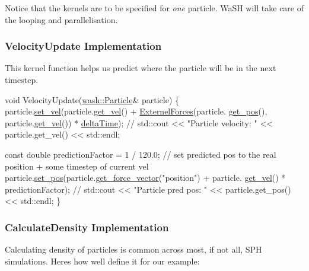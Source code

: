 Notice that the kernels are to be specified for {\itshape one} particle. Wa\+SH will take care of the looping and parallelisation.

\subsubsection*{Velocity\+Update Implementation}

This kernel function helps us predict where the particle will be in the next timestep. 
\begin{DoxyCode}
\textcolor{keywordtype}{void} VelocityUpdate(\mbox{\hyperlink{classwash_1_1Particle}{wash::Particle}}& particle) \{
    particle.\mbox{\hyperlink{classwash_1_1Particle_a4755365883cfd62117ebe74fe44d35e0}{set\_vel}}(particle.\mbox{\hyperlink{classwash_1_1Particle_a890d0f1467225393e385872b0c98b974}{get\_vel}}() + \mbox{\hyperlink{ca__fluid__sim_2fluid__sim_8cpp_a96532193226b3cbb236e6465defeb469}{ExternelForces}}(particle.
      \mbox{\hyperlink{classwash_1_1Particle_a9d222d453d640cf629ee8dfbee6b43c2}{get\_pos}}(), particle.\mbox{\hyperlink{classwash_1_1Particle_a890d0f1467225393e385872b0c98b974}{get\_vel}}()) * \mbox{\hyperlink{3d__fluid__sim_2fluid__sim_8cpp_a78e0adba8d27825f587ec87ed578015f}{deltaTime}});
    \textcolor{comment}{// std::cout << "Particle velocity: " << particle.get\_vel() << std::endl;}

    \textcolor{keyword}{const} \textcolor{keywordtype}{double} predictionFactor = 1 / 120.0;
    \textcolor{comment}{// set predicted pos to the real position + some timestep of current vel}
    particle.\mbox{\hyperlink{classwash_1_1Particle_af06835533935c04e594c258a7dcdd1ef}{set\_pos}}(particle.\mbox{\hyperlink{classwash_1_1Particle_a9c6ec5d5a7407897ecca00549bd05c01}{get\_force\_vector}}(\textcolor{stringliteral}{"position"}) + particle.
      \mbox{\hyperlink{classwash_1_1Particle_a890d0f1467225393e385872b0c98b974}{get\_vel}}() * predictionFactor);
    \textcolor{comment}{// std::cout << "Particle pred pos: " << particle.get\_pos() << std::endl;}
\}
\end{DoxyCode}


\subsubsection*{Calculate\+Density Implementation}

Calculating density of particles is common across most, if not all, S\+PH simulations. Here\textquotesingle{}s how we\textquotesingle{}ll define it for our example\+:


